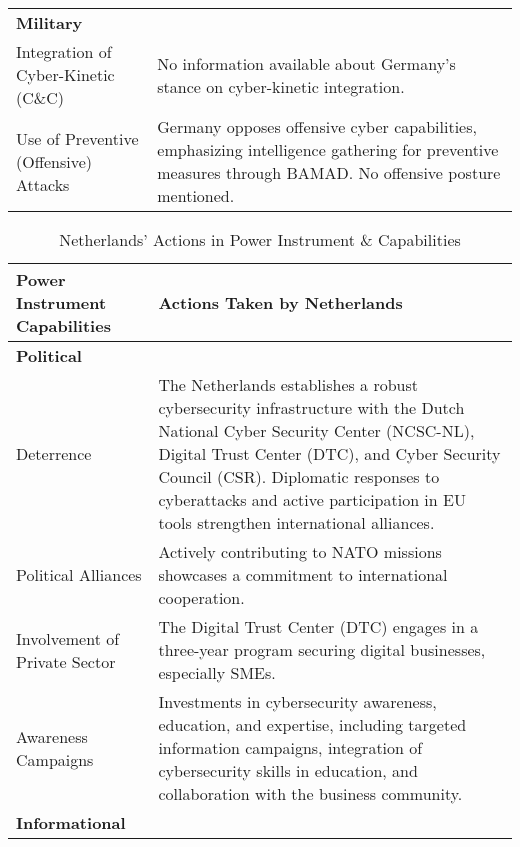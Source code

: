 \begin{table}[h]
\begin{tabular}{>{\raggedright}p{4cm} p{11cm}}
        \midrule
        \textbf{Military} & \\
        \hspace{0.2cm} Integration of Cyber-Kinetic (C\&C) & No information available about Germany's stance on cyber-kinetic integration. \\
        \hspace{0.2cm} Use of Preventive (Offensive) Attacks & Germany opposes offensive cyber capabilities, emphasizing intelligence gathering for preventive measures through BAMAD. No offensive posture mentioned. \\
        \bottomrule
    \end{tabular}
\end{table}


\begin{table}[h]
    \centering
    \renewcommand{\arraystretch}{1.5} %
    \caption{Netherlands' Actions in Power Instrument \& Capabilities}
    \begin{tabular}{>{\raggedright}p{4cm} p{11cm}}
        \toprule
        \textbf{Power Instrument Capabilities} & \textbf{Actions Taken by Netherlands} \\
        \midrule
        \textbf{Political} & \\
        \hspace{0.2cm} Deterrence & The Netherlands establishes a robust cybersecurity infrastructure with the Dutch National Cyber Security Center (NCSC-NL), Digital Trust Center (DTC), and Cyber Security Council (CSR). Diplomatic responses to cyberattacks and active participation in EU tools strengthen international alliances. \\
        \hspace{0.2cm} Political Alliances & Actively contributing to NATO missions showcases a commitment to international cooperation. \\
        \hspace{0.2cm} Involvement of Private Sector & The Digital Trust Center (DTC) engages in a three-year program securing digital businesses, especially SMEs. \\
        \hspace{0.2cm} Awareness Campaigns & Investments in cybersecurity awareness, education, and expertise, including targeted information campaigns, integration of cybersecurity skills in education, and collaboration with the business community. \\
        \midrule
        \textbf{Informational} & \\

\end{tabular}
\end{table}
